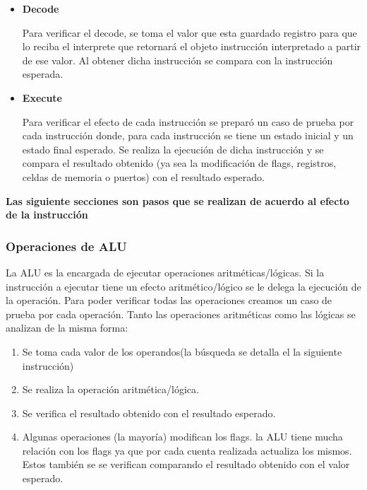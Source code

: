 \begin{enumerate}
\begin{itemize}
\item \textbf{Decode}

Para verificar el decode, se toma el valor que esta guardado registro \IR para que lo reciba el interprete que retornará el objeto instrucción interpretado a partir de ese valor. Al obtener dicha instrucción se compara con la instrucción esperada.
 
\item \textbf{Execute}

Para verificar el efecto de cada instrucción se preparó un caso de prueba por cada instrucción donde, para cada instrucción se tiene un estado inicial y un estado final esperado. Se realiza la ejecución de dicha instrucción y se compara el resultado obtenido (ya sea la modificación de flags, registros, celdas de memoria o puertos) con el resultado esperado. 

\end{itemize}

\textbf{Las siguiente secciones son pasos que se realizan de acuerdo al efecto de la instrucción}
  
\subsubsection{Operaciones de ALU}

La ALU es la encargada de ejecutar operaciones aritméticas/lógicas. Si la instrucción a ejecutar tiene un efecto aritmético/lógico se le delega la ejecución de la operación. Para poder verificar todas las operaciones creamos un caso de prueba por cada operación. Tanto las operaciones aritméticas como las lógicas se analizan de la misma forma:

\begin{enumerate}
\item Se toma cada valor de los operandos(la búsqueda se detalla el la siguiente instrucción)

\item Se realiza la operación aritmética/lógica. 

\item Se verifica el resultado obtenido con el resultado esperado.

\item Algunas operaciones (la mayoría) modifican los flags. la ALU tiene mucha relación con los flags ya que por cada cuenta realizada actualiza los mismos. Estos también se se verifican comparando el resultado obtenido con el valor esperado. 
\end{enumerate}


\end{enumerate}
